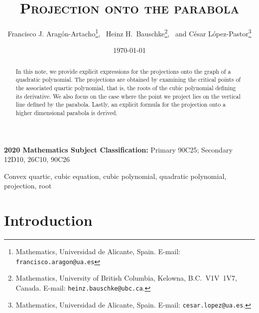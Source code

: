 \documentclass[11pt]{article}
\begin{document}
\title{\textsc{
Projection onto the parabola}}
\author{
Francisco J. Arag\'on-Artacho\thanks{
                 Mathematics, Universidad de Alicante, Spain.
                 E-mail: \texttt{francisco.aragon@ua.es}},~
Heinz H.\ Bauschke\thanks{
Mathematics, University
of British Columbia,
Kelowna, B.C.\ V1V~1V7, Canada. E-mail:
\texttt{heinz.bauschke@ubc.ca}.},~
         and C\'esar L\'opez-Pastor\thanks{
                 Mathematics, Universidad de Alicante, Spain.
                 E-mail: \texttt{cesar.lopez@ua.es}.}
                 }

\date{\today}

\maketitle


\vskip 8mm

\begin{abstract} 
In this note, we provide explicit expressions for the projections onto the graph of a quadratic polynomial. The projections are obtained by examining the critical points of the associated quartic polynomial, that is, the roots of the cubic polynomial defining its derivative. We also focus on the case where the point we project lies on the vertical line defined by the parabola. Lastly, an explicit formula for the projection onto a higher dimensional parabola is derived.
\end{abstract}

{\small
\noindent
{\bfseries 2020 Mathematics Subject Classification:}
{Primary 90C25; 
Secondary 12D10, 26C10, 90C26
}

Convex quartic, 
cubic equation, 
cubic polynomial,
quadratic polynomial,
projection,
root
}


\section{Introduction}\label{introduction}
\end{document}
